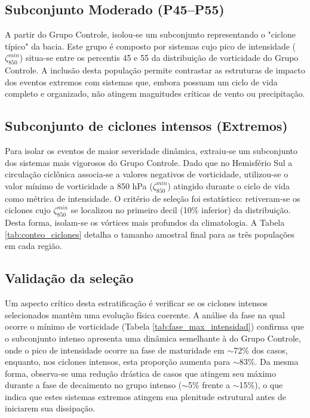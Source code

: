 \subsection{Subconjunto Moderado (P45--P55)}\label{subsec:grupo_moderado}
A partir do Grupo Controle, isolou-se um subconjunto representando o "ciclone típico" da bacia. Este grupo é composto por sistemas cujo pico de intensidade ($\zeta_{850}^{min}$) situa-se entre os percentis 45 e 55 da distribuição de vorticidade do Grupo Controle. A inclusão desta população permite contrastar as estruturas de impacto dos eventos extremos com sistemas que, embora possuam um ciclo de vida completo e organizado, não atingem magnitudes críticas de vento ou precipitação.

\subsection{Subconjunto de ciclones intensos (Extremos)}\label{subsec:grupo_intenso}
Para isolar os eventos de maior severidade dinâmica, extraiu-se um subconjunto dos sistemas mais vigorosos do Grupo Controle. Dado que no Hemisfério Sul a circulação ciclônica associa-se a valores negativos de vorticidade, utilizou-se o valor mínimo de vorticidade a 850 hPa ($\zeta_{850}^{min}$) atingido durante o ciclo de vida como métrica de intensidade. O critério de seleção foi estatístico: retiveram-se os ciclones cujo $\zeta_{850}^{min}$ se localizou no primeiro decil (10\% inferior) da distribuição. Desta forma, isolam-se os vórtices mais profundos da climatologia. A Tabela \ref{tab:conteo_ciclones} detalha o tamanho amostral final para as três populações em cada região.



\subsection{Validação da seleção}\label{subsec:validacao_selecao}
Um aspecto crítico desta estratificação é verificar se os ciclones intensos selecionados mantêm uma evolução física coerente. A análise da fase na qual ocorre o mínimo de vorticidade (Tabela \ref{tab:fase_max_intensidad}) confirma que o subconjunto intenso apresenta uma dinâmica semelhante à do Grupo Controle, onde o pico de intensidade ocorre na fase de maturidade em $\sim$72\% dos casos, enquanto, nos ciclones intensos, esta proporção aumenta para $\sim$83\%. Da mesma forma, observa-se uma redução drástica de casos que atingem seu máximo durante a fase de decaimento no grupo intenso ($\sim$5\% frente a $\sim$15\%), o que indica que estes sistemas extremos atingem sua plenitude estrutural antes de iniciarem sua dissipação.

